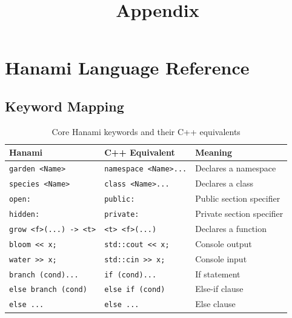 \documentclass[a4paper,12pt]{article}
\title{Appendix}
\date{}             %
\begin{document}
\maketitle

\appendix

\section{Hanami Language Reference}
\label{appendix:language-reference}

\subsection{Keyword Mapping}
\begin{table}[h!]
  \centering
  \caption{Core Hanami keywords and their C++ equivalents}
  \begin{tabular}{llp{6cm}}
    \toprule
    \textbf{Hanami} & \textbf{C++ Equivalent} & \textbf{Meaning} \\
    \midrule
    \texttt{garden <Name>}        & \texttt{namespace <Name>{...}}    & Declares a namespace \\
    \texttt{species <Name>}       & \texttt{class <Name>{...}}        & Declares a class \\
    \texttt{open:}                & \texttt{public:}                  & Public section specifier \\
    \texttt{hidden:}              & \texttt{private:}                 & Private section specifier \\
    \texttt{grow <f>(...) -> <t>} & \texttt{<t> <f>(...)}             & Declares a function \\
    \texttt{bloom << x;}          & \texttt{std::cout << x;}         & Console output \\
    \texttt{water >> x;}          & \texttt{std::cin >> x;}          & Console input \\
    \texttt{branch (cond){...}}   & \texttt{if (cond){...}}           & If statement \\
    \texttt{else branch (cond)}   & \texttt{else if (cond)}           & Else-if clause \\
    \texttt{else {...}}           & \texttt{else {...}}               & Else clause \\
    \bottomrule
  \end{tabular}
\end{table}

\end{document}
